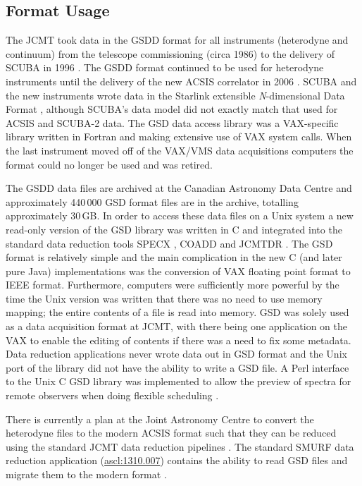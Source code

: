 \documentclass[final,authoryear,5p,times,twocolumn]{elsarticle}
\newcommand{\ascl}[1]{\href{http://www.ascl.net/#1}{ascl:#1}}
\begin{document}
\subsection{Format Usage}

The JCMT took data in the GSDD format for all instruments (heterodyne
and continuum) from the telescope commissioning (circa 1986) to the
delivery of SCUBA in 1996 \citep{1999MNRAS.303..659H}. The GSDD format
continued to be used for heterodyne instruments until the delivery of
the new ACSIS correlator in 2006 \citep{2009MNRAS.399.1026B}. SCUBA
and the new instruments wrote data in the Starlink extensible
\emph{N}-dimensional Data Format \citep[NDF;][]{2015NDF}, although
SCUBA's data model did not exactly match that used for ACSIS and
SCUBA-2 \citep{2013MNRAS.430.2513H} data. The GSD data access library
was a VAX-specific library \citep{1986QJRAS..27..675.,mtdn84} written
in Fortran and making extensive use of VAX system calls. When
the last instrument moved off of the VAX/VMS data acquisitions computers
the format could no longer be used and was retired.

The GSDD data files are archived at the Canadian Astronomy Data
Centre and approximately 440\,000 GSD format files are in the
archive, totalling approximately 30\,GB. In order to access these data
files on a Unix system a new read-only version of the GSD library was
written in C \citep[][\ascl{1503.009}]{SUN229} and integrated into the standard data
reduction tools SPECX \citep[][\ascl{1310.008}]{SPECX,1990JCMTP...9...25P}, COADD
\citep[][\ascl{1411.020}]{COADD}  and JCMTDR
\citep[][\ascl{1406.019}]{SUN132}.  The GSD format is relatively
simple and the main complication in the new C (and later pure Java)
implementations was the conversion of VAX floating point format to
IEEE format. Furthermore, computers were sufficiently more powerful
by the time the Unix version was written that there was no need to use
memory mapping; the entire contents of a file is read into memory.
GSD was solely used as a data acquisition format at JCMT, with there
being one application on the VAX to enable the editing of contents if
there was a need to fix some metadata. Data reduction applications
never wrote data out in GSD format and the Unix port of the library
did not have the ability to write a GSD file.
A Perl interface to the Unix C GSD library \citep{1999ASPC..172..494J}
was implemented to allow the preview of spectra for remote observers
when doing flexible scheduling \citep{1997ASPC..125..401J}.

There is currently a plan at the Joint Astronomy Centre to convert the
heterodyne files to the modern ACSIS format \citep{OCS_ICD_022} such that they can be
reduced using the standard JCMT data reduction pipelines
\citep{2015ACSISDR,2008ASPC..394..565J}. The standard SMURF data reduction application
(\ascl{1310.007}\nocite{2013ascl.soft10007J}) contains the ability to
read GSD files and migrate them to the modern format \citep{SUN259}.
\end{document}
